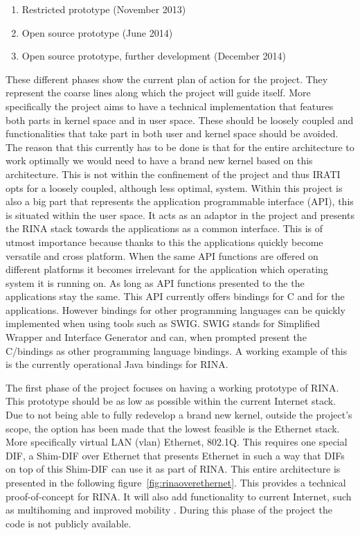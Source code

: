 \begin{enumerate}
	\item Restricted prototype (November 2013)
	\item Open source prototype (June 2014)
	\item Open source prototype, further development (December 2014)
\end{enumerate}

These different phases show the current plan of action for the project. They represent the coarse lines along which the project will guide itself. More specifically the project aims to have a technical implementation that features both parts in kernel space and in user space. These should be loosely coupled and functionalities that take part in both user and kernel space should be avoided. The reason that this currently has to be done is that for the entire architecture to work optimally we would need to have a brand new kernel based on this architecture. This is not within the confinement of the project and thus IRATI opts for a loosely coupled, although less optimal, system. Within this project is also a big part that represents the application programmable interface (API), this is situated within the user space. It acts as an adaptor in the project and presents the RINA stack towards the applications as a common interface. This is of utmost importance because thanks to this the applications quickly become versatile and cross platform. When the same API functions are offered on different platforms it becomes irrelevant for the application which operating system it is running on. As long as API functions presented to the the applications stay the same. This API currently offers bindings for C and \cpp for the applications. However bindings for other programming languages can be quickly implemented when using tools such as SWIG. SWIG stands for Simplified Wrapper and Interface Generator and can, when prompted present the C/\cpp bindings as other programming language bindings. A working example of this is the currently operational Java bindings for RINA. 

\npar

The first phase of the project focuses on having a working prototype of RINA. This prototype should be as low as possible within the current Internet stack. Due to not being able to fully redevelop a brand new kernel, outside the project's scope, the option has been made that the lowest feasible is the Ethernet stack. More specifically virtual LAN (vlan) Ethernet, 802.1Q. This requires one special DIF, a Shim-DIF over Ethernet that presents Ethernet in such a way that DIFs on top of this Shim-DIF can use it as part of RINA. This entire architecture is presented in the following figure~\ref{fig:rinaoverethernet}. This provides a technical proof-of-concept for RINA. It will also add functionality to current Internet, such as multihoming and improved mobility \citep{vrijders2014prototyping}. During this phase of the project the code is not publicly available.

